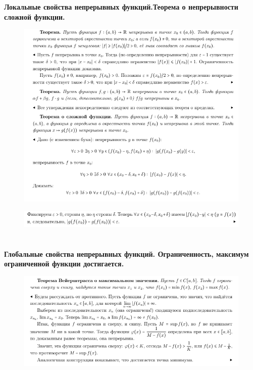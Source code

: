 \section{}

\textbf{Локальные свойства непрерывных функций.Теорема о непрерывности сложной функции.}
 \begin{figure}[h!]
\centering
\includegraphics[scale=0.6]{Pictures/29_1.png}
\end{figure}
\begin{figure}[h!]
\centering
\includegraphics[scale=0.6]{Pictures/29-2.png}
\end{figure}
\newpage

\section{}

\textbf{Глобальные свойства непрерывных функций. Ограниченность, максимум ограниченной функции достигается.}
\begin{figure}[h!]
\centering
\includegraphics[scale=0.7]{Pictures/30.png}
\end{figure}




